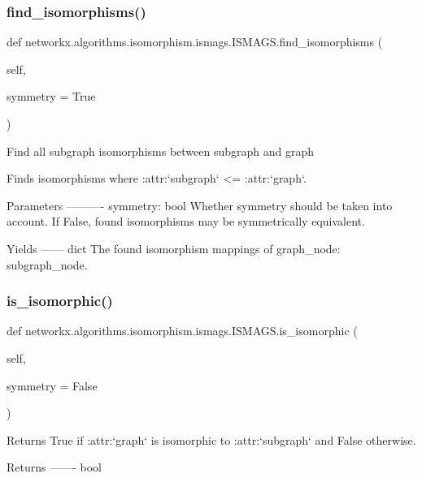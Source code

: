 \subsubsection{\texorpdfstring{find\+\_\+isomorphisms()}{find\_isomorphisms()}}
{\footnotesize\ttfamily def networkx.\+algorithms.\+isomorphism.\+ismags.\+I\+S\+M\+A\+G\+S.\+find\+\_\+isomorphisms (\begin{DoxyParamCaption}\item[{}]{self,  }\item[{}]{symmetry = {\ttfamily True} }\end{DoxyParamCaption})}

\begin{DoxyVerb}Find all subgraph isomorphisms between subgraph and graph

Finds isomorphisms where :attr:`subgraph` <= :attr:`graph`.

Parameters
----------
symmetry: bool
    Whether symmetry should be taken into account. If False, found
    isomorphisms may be symmetrically equivalent.

Yields
------
dict
    The found isomorphism mappings of {graph_node: subgraph_node}.
\end{DoxyVerb}
 \mbox{\label{classnetworkx_1_1algorithms_1_1isomorphism_1_1ismags_1_1ISMAGS_a29848db92e352ca9ae78be71d38e8879}} 
\subsubsection{\texorpdfstring{is\+\_\+isomorphic()}{is\_isomorphic()}}
{\footnotesize\ttfamily def networkx.\+algorithms.\+isomorphism.\+ismags.\+I\+S\+M\+A\+G\+S.\+is\+\_\+isomorphic (\begin{DoxyParamCaption}\item[{}]{self,  }\item[{}]{symmetry = {\ttfamily False} }\end{DoxyParamCaption})}

\begin{DoxyVerb}Returns True if :attr:`graph` is isomorphic to :attr:`subgraph` and
False otherwise.

Returns
-------
bool
\end{DoxyVerb}
 \mbox{\label{classnetworkx_1_1algorithms_1_1isomorphism_1_1ismags_1_1ISMAGS_ab5c2f624ad727727c51c3c2e53ba7637}} 
